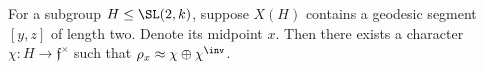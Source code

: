 \documentclass{amsart}
\begin{document}
	
	
		

\begin{lemma}
	For a subgroup $H \leq \SL(2,k)$, suppose $X(H)$ contains a geodesic segment $[y,z]$ of length two. Denote its midpoint $x$. Then there exists a character $\chi : H \to \mathfrak{f}^{\times}$ such that $\rho_{x} \approx \chi \oplus \chi^{\inv}$. 
\end{lemma}	
	
\end{document}
